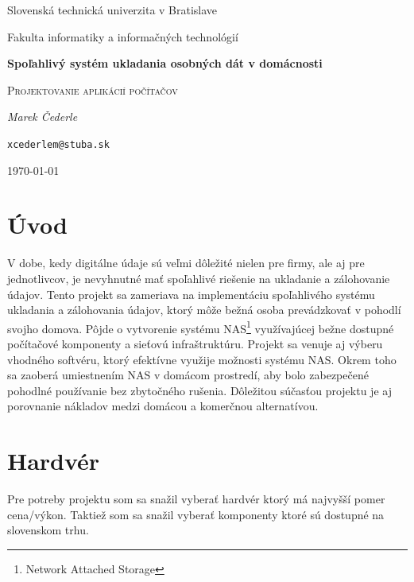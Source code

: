 \documentclass[12pt,oneside,slovak,a4paper]{article}
\begin{document}
\linespread{1.5}\selectfont

\begin{titlepage}
	\centering
    {\Large Slovenská technická univerzita v Bratislave\par}
    {\Large Fakulta informatiky a informačných technológií\par}
	\vspace{7cm}
	{\huge\bfseries Spoľahlivý systém ukladania osobných dát v domácnosti\par}
	\vspace{0.5cm}
    {\Large \textsc{Projektovanie aplikácií počítačov}\par}
    \vspace{1cm}
	{\Large\itshape Marek Čederle\par}
    {\small\texttt{xcederlem@stuba.sk}\par}
	\vfill

	{\large \today\par}
\end{titlepage}


\tableofcontents
\vspace*{\fill}
\newpage


\nocite{*}

\section{Úvod}
V dobe, kedy digitálne údaje sú veľmi dôležité nielen pre firmy, ale aj pre jednotlivcov, je nevyhnutné mať spoľahlivé riešenie na ukladanie a zálohovanie údajov. Tento projekt sa zameriava na implementáciu spoľahlivého systému ukladania a zálohovania údajov, ktorý môže bežná osoba prevádzkovať v pohodlí svojho domova. Pôjde o vytvorenie systému NAS\footnote{Network Attached Storage} využívajúcej bežne dostupné počítačové komponenty a sieťovú infraštruktúru. Projekt sa venuje aj výberu vhodného softvéru, ktorý efektívne využije možnosti systému NAS. Okrem toho sa zaoberá umiestnením NAS v domácom prostredí, aby bolo zabezpečené pohodlné používanie bez zbytočného rušenia. Dôležitou súčasťou projektu je aj porovnanie nákladov medzi domácou a komerčnou alternatívou.

\section{Hardvér}
Pre potreby projektu som sa snažil vyberať hardvér ktorý má najvyšší pomer cena/výkon. Taktiež som sa snažil vyberať komponenty ktoré sú dostupné na slovenskom trhu.
\end{document}
